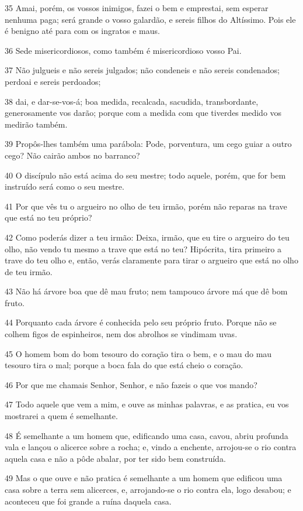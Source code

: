 \par 35 Amai, porém, os vossos inimigos, fazei o bem e emprestai, sem esperar nenhuma paga; será grande o vosso galardão, e sereis filhos do Altíssimo. Pois ele é benigno até para com os ingratos e maus.
\par 36 Sede misericordiosos, como também é misericordioso vosso Pai.
\par 37 Não julgueis e não sereis julgados; não condeneis e não sereis condenados; perdoai e sereis perdoados;
\par 38 dai, e dar-se-vos-á; boa medida, recalcada, sacudida, transbordante, generosamente vos darão; porque com a medida com que tiverdes medido vos medirão também.
\par 39 Propôs-lhes também uma parábola: Pode, porventura, um cego guiar a outro cego? Não cairão ambos no barranco?
\par 40 O discípulo não está acima do seu mestre; todo aquele, porém, que for bem instruído será como o seu mestre.
\par 41 Por que vês tu o argueiro no olho de teu irmão, porém não reparas na trave que está no teu próprio?
\par 42 Como poderás dizer a teu irmão: Deixa, irmão, que eu tire o argueiro do teu olho, não vendo tu mesmo a trave que está no teu? Hipócrita, tira primeiro a trave do teu olho e, então, verás claramente para tirar o argueiro que está no olho de teu irmão.
\par 43 Não há árvore boa que dê mau fruto; nem tampouco árvore má que dê bom fruto.
\par 44 Porquanto cada árvore é conhecida pelo seu próprio fruto. Porque não se colhem figos de espinheiros, nem dos abrolhos se vindimam uvas.
\par 45 O homem bom do bom tesouro do coração tira o bem, e o mau do mau tesouro tira o mal; porque a boca fala do que está cheio o coração.
\par 46 Por que me chamais Senhor, Senhor, e não fazeis o que vos mando?
\par 47 Todo aquele que vem a mim, e ouve as minhas palavras, e as pratica, eu vos mostrarei a quem é semelhante.
\par 48 É semelhante a um homem que, edificando uma casa, cavou, abriu profunda vala e lançou o alicerce sobre a rocha; e, vindo a enchente, arrojou-se o rio contra aquela casa e não a pôde abalar, por ter sido bem construída.
\par 49 Mas o que ouve e não pratica é semelhante a um homem que edificou uma casa sobre a terra sem alicerces, e, arrojando-se o rio contra ela, logo desabou; e aconteceu que foi grande a ruína daquela casa.

